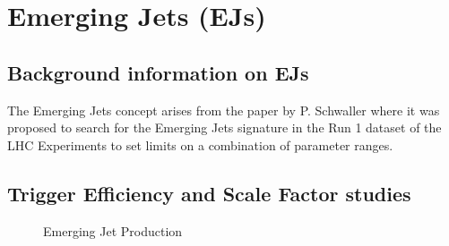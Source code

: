 \chapter{Emerging Jets (EJs) \label{ch:emj}}


\section{Background information on EJs}

The Emerging Jets concept arises from the paper by P. Schwaller \cite{Schwaller:2015gea} where it was proposed to search for the Emerging Jets signature in the Run 1 dataset of the LHC Experiments to set limits on a combination of parameter ranges.

\section{Trigger Efficiency and Scale Factor studies}

\begin{figure}
    \begin{center}
        \caption{Emerging Jet Production}
    \end{center}
\end{figure}
